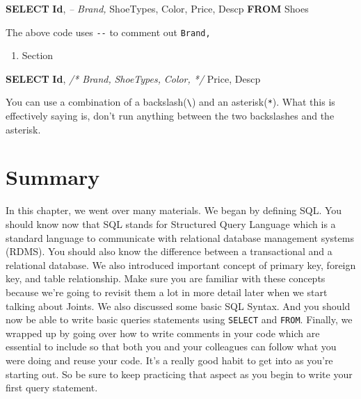\documentclass[]{book}
\makeatletter
\newenvironment{Shaded}{\begin{snugshade}}{\end{snugshade}}
\newcommand{\KeywordTok}[1]{\textcolor[rgb]{0.13,0.29,0.53}{\textbf{{#1}}}}
\newcommand{\CommentTok}[1]{\textcolor[rgb]{0.56,0.35,0.01}{\textit{{#1}}}}
\newcommand{\NormalTok}[1]{{#1}}
\providecommand{\tightlist}{%
  \setlength{\itemsep}{0pt}\setlength{\parskip}{0pt}}
\newenvironment{kframe}{%
\medskip{}
\setlength{\fboxsep}{.8em}
 \def\at@end@of@kframe{}%
 \ifinner\ifhmode%
  \def\at@end@of@kframe{\end{minipage}}%
  \begin{minipage}{\columnwidth}%
 \fi\fi%
 \def\FrameCommand##1{\hskip\@totalleftmargin \hskip-\fboxsep
 \colorbox{shadecolor}{##1}\hskip-\fboxsep
     \hskip-\linewidth \hskip-\@totalleftmargin \hskip\columnwidth}%
 \MakeFramed {\advance\hsize-\width
   \@totalleftmargin\z@ \linewidth\hsize
   \@setminipage}}%
 {\par\unskip\endMakeFramed%
 \at@end@of@kframe}
\renewenvironment{Shaded}{\begin{kframe}}{\end{kframe}}
\theoremstyle{definition}
\theoremstyle{definition}
\theoremstyle{remark}
\makeatother
\begin{document}
\begin{Shaded}
\begin{Highlighting}[]
\KeywordTok{SELECT} \KeywordTok{Id}\NormalTok{, }
\CommentTok{-- Brand,}
\NormalTok{ShoeTypes,}
\NormalTok{Color,}
\NormalTok{Price,}
\NormalTok{Descp}
\KeywordTok{FROM} \NormalTok{Shoes}
\end{Highlighting}
\end{Shaded}

The above code uses \texttt{-\/-} to comment out \texttt{Brand,}

\begin{enumerate}
\def\labelenumi{(\arabic{enumi})}
\setcounter{enumi}{1}
\tightlist
\item
  Section
\end{enumerate}

\begin{Shaded}
\begin{Highlighting}[]
\KeywordTok{SELECT} \KeywordTok{Id}\NormalTok{, }
\CommentTok{/* Brand,}
\CommentTok{ShoeTypes,}
\CommentTok{Color, */}
\NormalTok{Price,}
\NormalTok{Descp}
\end{Highlighting}
\end{Shaded}

You can use a combination of a backslash(\texttt{\textbackslash{}}) and
an asterisk(\texttt{*}). What this is effectively saying is, don't run
anything between the two backslashes and the asterisk.

\section{Summary}\label{summary}

In this chapter, we went over many materials. We began by defining SQL.
You should know now that SQL stands for Structured Query Language which
is a standard language to communicate with relational database
management systems (RDMS). You should also know the difference between a
transactional and a relational database. We also introduced important
concept of primary key, foreign key, and table relationship. Make sure
you are familiar with these concepts because we're going to revisit them
a lot in more detail later when we start talking about Joints. We also
discussed some basic SQL Syntax. And you should now be able to write
basic queries statements using \texttt{SELECT} and \texttt{FROM}.
Finally, we wrapped up by going over how to write comments in your code
which are essential to include so that both you and your colleagues can
follow what you were doing and reuse your code. It's a really good habit
to get into as you're starting out. So be sure to keep practicing that
aspect as you begin to write your first query statement.
\end{document}
